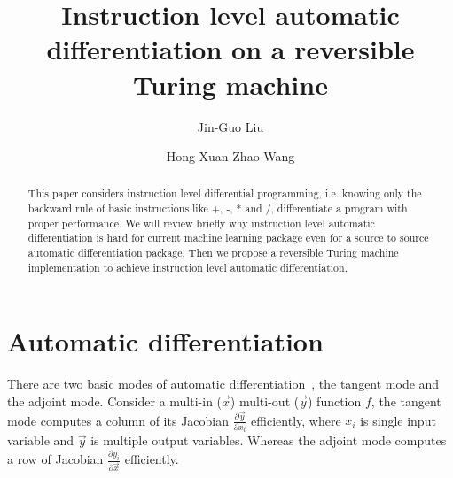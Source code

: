\documentclass[aps,twocolumn,longbibliography,english,superscriptaddress,prr]{revtex4-1}
\newcommand{\<}{\langle}
\renewcommand{\>}{\rangle}
\begin{document}
\title{Instruction level automatic differentiation on a reversible Turing machine}


\author{Jin-Guo Liu}

\author{Hong-Xuan Zhao-Wang}

\begin{abstract}
    This paper considers instruction level differential programming, i.e. knowing only the backward rule of basic instructions like +, -, * and /, differentiate a program with proper performance. We will review briefly why instruction level automatic differentiation is hard for current machine learning package even for a source to source automatic differentiation package. Then we propose a reversible Turing machine implementation to achieve instruction level automatic differentiation.
\end{abstract}


\maketitle

\section{Automatic differentiation}
There are two basic modes of automatic differentiation~\cite{thelongpaper}, the tangent mode\cite{forwarddiff} and the adjoint mode.
Consider a multi-in ($\vec{x}$) multi-out ($\vec{y}$) function $f$, the tangent mode computes a column of its Jacobian $\frac{\partial \vec{y}}{\partial x_i}$ efficiently, where $x_i$ is single input variable and $\vec{y}$ is multiple output variables.
Whereas the adjoint mode computes a row of Jacobian $\frac{\partial y_i}{\partial \vec{x}}$ efficiently.
\end{document}
